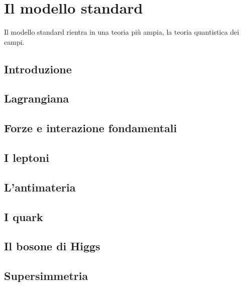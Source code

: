 \documentclass[letterpaper,10pt,italian]{jupyterBook}
\begin{document}
\section{Il modello standard}
\label{\detokenize{ch/modern/standard:il-modello-standard}}
\sphinxAtStartPar
Il modello standard rientra in una teoria più ampia, la teoria quantistica dei campi.


\subsection{Introduzione}
\label{\detokenize{ch/modern/standard:introduzione}}

\subsection{Lagrangiana}
\label{\detokenize{ch/modern/standard:lagrangiana}}

\subsection{Forze e interazione fondamentali}
\label{\detokenize{ch/modern/standard:forze-e-interazione-fondamentali}}

\subsection{I leptoni}
\label{\detokenize{ch/modern/standard:i-leptoni}}

\subsection{L’antimateria}
\label{\detokenize{ch/modern/standard:l-antimateria}}

\subsection{I quark}
\label{\detokenize{ch/modern/standard:i-quark}}

\subsection{Il bosone di Higgs}
\label{\detokenize{ch/modern/standard:il-bosone-di-higgs}}

\subsection{Supersimmetria}
\label{\detokenize{ch/modern/standard:supersimmetria}}
\end{document}
